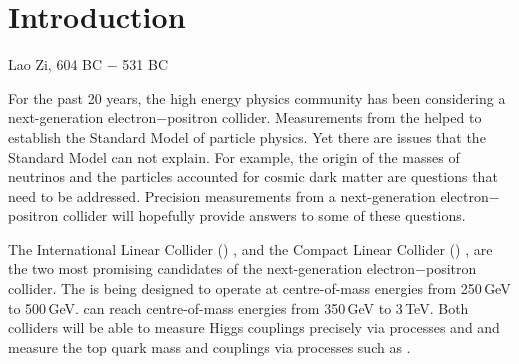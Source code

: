 \chapter{Introduction}
\label{chap:Introduction}



%
{Lao Zi, 604 BC $-$ 531 BC}%

For the past 20 years, the high energy physics community has been considering a next-generation electron$-$positron collider. Measurements from the \LHC helped to establish the Standard Model of particle physics. Yet there are issues that the Standard Model can not explain. For example, the origin of the masses of neutrinos and the particles accounted for cosmic dark matter are questions that need to be addressed. Precision measurements from a next-generation electron$-$positron collider will hopefully provide answers to some of these questions.


The International Linear Collider (\ILC)  \cite{Brau:2007zza}, and the Compact Linear Collider (\CLIC) \cite{Linssen:2012hp}, are the  two most promising candidates of the next-generation electron$-$positron collider. The \ILC is being designed to operate at centre-of-mass energies from 250\,GeV to 500\,GeV. \CLIC can reach centre-of-mass energies from 350\,GeV to 3\,TeV. Both colliders will be able to measure Higgs couplings precisely via processes  \HepProcess{\ee \to \PZ \PHiggs} and \HepProcess{\ee \to \PHiggs \Pneutrino \Pneutrino} and measure the top quark mass and couplings via processes such as \HepProcess{\ee \to \Ptop \APtop}.

